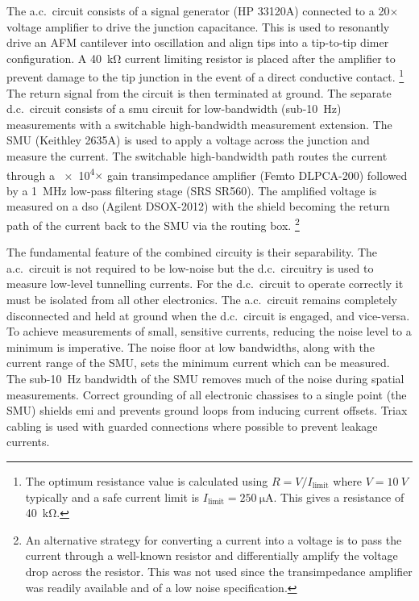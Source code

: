 \documentclass{article}
\begin{document}
The a.c.\ circuit consists of a signal generator (HP 33120A) connected to a 20$\times$ voltage amplifier to drive the junction capacitance. This is used to resonantly drive an AFM cantilever into oscillation and align tips into a tip-to-tip dimer configuration. A \SI{40}{\kilo\ohm} current limiting resistor is placed after the amplifier to prevent damage to the tip junction in the event of a direct conductive contact.%
\footnote{The optimum resistance value is calculated using $R = V/I_{\mathrm{limit}}$ where $V=\SI{10}{V}$ typically and a safe current limit is $I_{\mathrm{limit}}=\SI{250}{\micro\ampere}$. This gives a resistance of \SI{40}{\kilo\ohm}.}
The return signal from the circuit is then terminated at ground. The separate d.c.\ circuit consists of a \gls{smu} circuit for low-bandwidth (sub-\SI{10}{Hz}) measurements with a switchable high-bandwidth measurement extension. The SMU (Keithley 2635A) is used to apply a voltage across the junction and measure the current. The switchable high-bandwidth path routes the current through a \num{e4}$\times$ gain transimpedance amplifier (Femto DLPCA-200) followed by a \SI{1}{MHz} low-pass filtering stage (SRS SR560). The amplified voltage is measured on a \gls{dso} (Agilent DSOX-2012) with the shield becoming the return path of the current back to the SMU via the routing box.%
\footnote{An alternative strategy for converting a current into a voltage is to pass the current through a well-known resistor and differentially amplify the voltage drop across the resistor. This was not used since the transimpedance amplifier was readily available and of a low noise specification.}

The fundamental feature of the combined circuity is their separability. The a.c.\ circuit is not required to be low-noise but the d.c.\ circuitry is used to measure low-level tunnelling currents. For the d.c.\ circuit to operate correctly it must be isolated from all other electronics. The a.c.\ circuit remains completely disconnected and held at ground when the d.c.\ circuit is engaged, and vice-versa.
To achieve measurements of small, sensitive currents, reducing the noise level to a minimum is imperative. The noise floor at low bandwidths, along with the current range of the SMU, sets the minimum current which can be measured. The sub-\SI{10}{Hz} bandwidth of the SMU removes much of the noise during spatial measurements. Correct grounding of all electronic chassises to a single point (the SMU) shields \gls{emi} and prevents ground loops from inducing current offsets. Triax cabling is used with guarded connections where possible to prevent leakage currents.
\end{document}
